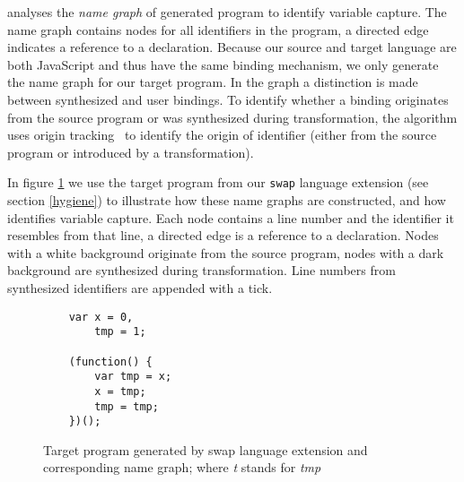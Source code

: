 \textit{\vfix} analyses the \textit{name graph} of generated program to identify variable capture. The name graph contains nodes for all identifiers in the program, a directed edge indicates a reference to a declaration. Because our source and target language are both JavaScript and thus have the same binding mechanism, we only generate the name graph for our target program. In the graph a distinction is made between synthesized and user bindings. To identify whether a binding originates from the source program or was synthesized during transformation, the \textit{\vfix} algorithm uses origin tracking~\cite{Inostroza2014} to identify the origin of identifier (either from the source program or introduced by a transformation).

In figure \ref{fig:name-graph} we use the target program from our \lstinline$swap$ language extension (see section \ref{hygiene}) to illustrate how these name graphs are constructed, and how \textit{\vfix} identifies variable capture. Each node contains a line number and the identifier it resembles from that line, a directed edge is a reference to a declaration. Nodes with a white background originate from the source program, nodes with a dark background are synthesized during transformation. Line numbers from synthesized identifiers are appended with a tick.

\begin{figure}[h]
\centering
\begin{minipage}{0.25\linewidth}
\begin{lstlisting}
	var x = 0,
		tmp = 1;

	(function() {
		var tmp = x;
		x = tmp;
		tmp = tmp;
	})();
\end{lstlisting}
\end{minipage}
\hfill
\begin{minipage}{0.65\linewidth}
\end{minipage}

\caption{Target program generated by swap language extension and corresponding name graph; where \textit{t} stands for \textit{tmp}} \label{fig:name-graph}
\end{figure}

